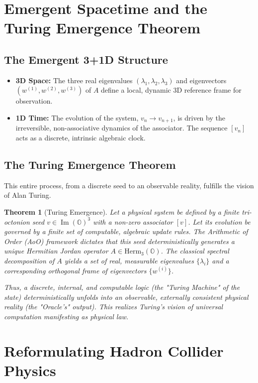 \documentclass[11pt, a4paper]{article}
\newtheorem{theorem}{Theorem}[section]
\theoremstyle{definition}
\theoremstyle{remark}
\begin{document}
\section{Emergent Spacetime and the Turing Emergence Theorem}

\subsection{The Emergent 3+1D Structure}
\begin{itemize}
    \item \textbf{3D Space:} The three real eigenvalues $(\lambda_1, \lambda_2, \lambda_3)$ and eigenvectors $(w^{(1)}, w^{(2)}, w^{(3)})$ of $A$ define a local, dynamic 3D reference frame for observation.
    \item \textbf{1D Time:} The evolution of the system, $v_n \to v_{n+1}$, is driven by the irreversible, non-associative dynamics of the associator. The sequence $[v_n]$ acts as a discrete, intrinsic algebraic clock.
\end{itemize}

\subsection{The Turing Emergence Theorem}
This entire process, from a discrete seed to an observable reality, fulfills the vision of Alan Turing.

\begin{theorem}[Turing Emergence]\label{thm:turing}
\textit{Let a physical system be defined by a finite tri-octonion seed $v \in \operatorname{Im}(\mathbb{O})^3$ with a non-zero associator $[v]$. Let its evolution be governed by a finite set of computable, algebraic update rules. The Arithmetic of Order (AoO) framework dictates that this seed deterministically generates a unique Hermitian Jordan operator $A \in \mathrm{Herm}_3(\mathbb{O})$. The classical spectral decomposition of $A$ yields a set of real, measurable eigenvalues $\{\lambda_i\}$ and a corresponding orthogonal frame of eigenvectors $\{w^{(i)}\}$.}

\textit{Thus, a discrete, internal, and computable logic (the "Turing Machine" of the state) deterministically unfolds into an observable, externally consistent physical reality (the "Oracle's" output). This realizes Turing’s vision of universal computation manifesting as physical law.}
\end{theorem}

\section{Reformulating Hadron Collider Physics}
\end{document}
